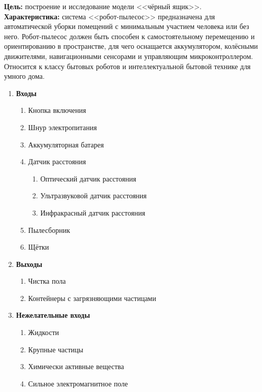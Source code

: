     
\textbf{Цель:} построение и исследование модели <<чёрный ящик>>.\\

\textbf{Характеристика:} система <<робот-пылесос>> предназначена для автоматической уборки помещений с минимальным участием человека или без него. Робот-пылесос должен быть способен к самостоятельному перемещению и ориентированию в пространстве, для чего оснащается аккумулятором, колёсными движителями, навигационными сенсорами и управляющим микроконтроллером. Относится к классу бытовых роботов и интеллектуальной бытовой технике для умного дома.\\

\begin{enumerate}
    \item \textbf{Входы}
    \begin{enumerate}[label*=\arabic*.]
        \item Кнопка включения
        \item Шнур электропитания
        \item Аккумуляторная батарея
        \item Датчик расстояния
        \begin{enumerate}[label*=\arabic*.]
            \item Оптический датчик расстояния
            \item Ультразвуковой датчик расстояния
            \item Инфракрасный датчик расстояния
        \end{enumerate}
        \item Пылесборник
        \item Щётки
    \end{enumerate}
    \item \textbf{Выходы}
    \begin{enumerate}[label*=\arabic*.]
        \item Чистка пола
        \item Контейнеры с загрязняющими частицами
    \end{enumerate}
    \item \textbf{Нежелательные входы}
    \begin{enumerate}[label*=\arabic*.]
        \item Жидкости
        \item Крупные частицы
        \item Химически активные вещества
        \item Сильное электромагнитное поле

\end{enumerate}
\end{enumerate}
